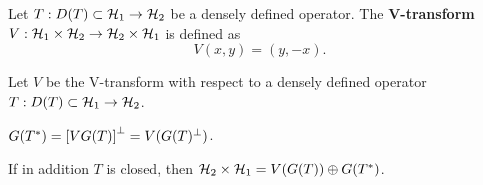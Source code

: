 \begin{definition}
    Let $T:D(T)\subset\mathcal{H}_1\to\mathcal{H}_2$ be a densely defined operator. 
    The \textbf{V-transform} $V:\mathcal{H}_1\times\mathcal{H}_2\to\mathcal{H}_2\times\mathcal{H}_1$ 
    is defined as 
    \begin{equation*}
        V(x,y) = (y, -x).
    \end{equation*}
\end{definition}

\begin{lemma}\label{lem:v-transform}
    Let $V$ be the V-transform with respect to a densely defined
    operator $T:D(T)\subset\mathcal{H}_1\to\mathcal{H}_2$. 
    \begin{thmenum}
        \item $G(T^*) = \left[ {VG(T)} \right]^\perp = V(G(T)^\perp)$.
        \item If in addition $T$ is closed, then $\mathcal{H}_2\times\mathcal{H}_1 = V(G(T))\oplus G(T^*)$. 
    \end{thmenum} 
\end{lemma}
